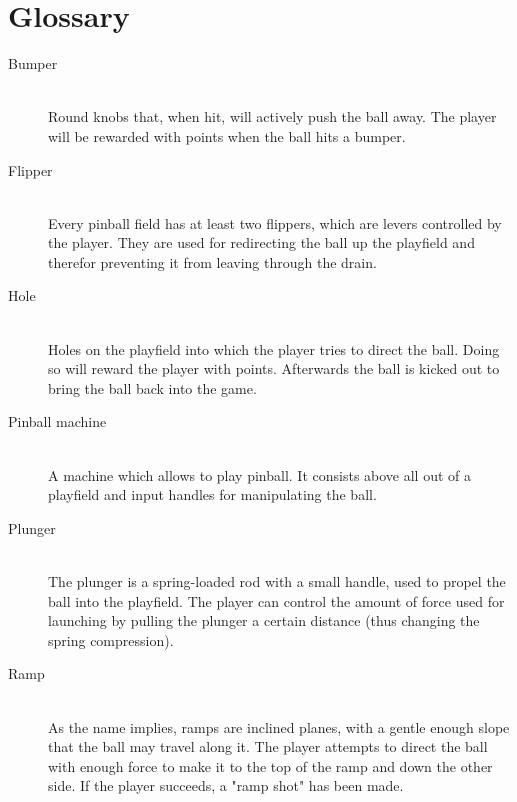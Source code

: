 \documentclass[fontsize=12pt,
               paper=a4,
               twoside=false,
               parskip=half,
               ]{scrartcl}
\begin{document}
\newcommand{\doctitle}{Glossary}


\section*{Glossary}

\begin{description}

\item[Bumper] \hfill \\
Round knobs that, when hit, will actively push the ball away. %
The player will be rewarded with points when the ball hits a bumper.

\item[Flipper] \hfill \\
Every pinball field has at least two flippers, which are levers controlled by the player. They are used for redirecting the ball up the playfield and therefor preventing it from leaving through the drain.

\item[Hole] \hfill \\
Holes on the playfield into which the player tries to direct the ball. Doing so will reward the player with points. Afterwards the ball is kicked out to bring the ball back into the game.

\item[Pinball machine] \hfill \\
A machine which allows to play pinball. It consists above all out of a playfield and input handles for manipulating the ball.

\item[Plunger] \hfill \\
The plunger is a spring-loaded rod with a small handle, used to propel the ball into the playfield. The player can control the amount of force used for launching by pulling the plunger a certain distance (thus changing the spring compression). 

\item[Ramp] \hfill \\
As the name implies, ramps are inclined planes, with a gentle enough slope that the ball may travel along it. The player attempts to direct the ball with enough force to make it to the top of the ramp and down the other side. If the player succeeds, a "ramp shot" has been made. %


\end{description}
\end{document}
